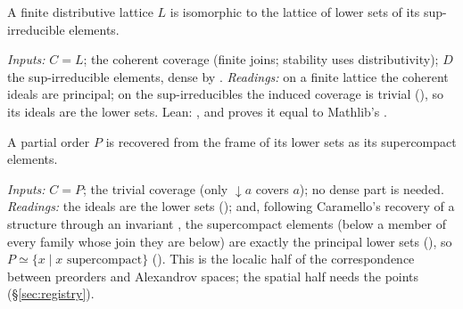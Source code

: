 \documentclass[11pt]{article}
\begin{document}
\begin{bridge}
A finite distributive lattice $L$ is isomorphic to the lattice of lower sets of its
sup-irreducible elements.
\end{bridge}
\emph{Inputs:} $C=L$; the coherent coverage (finite joins; stability uses distributivity); $D$ the
sup-irreducible elements, dense by . \emph{Readings:} on a
finite lattice the coherent ideals are principal; on the sup-irreducibles the induced coverage is
trivial (), so its ideals are the lower sets. Lean:
, and  proves it equal to Mathlib's
.

\begin{bridge}
A partial order $P$ is recovered from the frame of its lower sets as its supercompact elements.
\end{bridge}
\emph{Inputs:} $C=P$; the trivial coverage (only $\downarrow a$ covers $a$); no dense part is
needed. \emph{Readings:} the ideals are the lower sets (); and, following
Caramello's recovery of a structure through an invariant \cite[Thm.~3.27]{caramello-stone}, the
supercompact elements (below a member of every family whose join they are below) are exactly the
principal lower sets (), so $P\simeq\{x\mid x \text{ supercompact}\}$
(). This is the localic half of the correspondence between preorders
and Alexandrov spaces; the spatial half needs the points (\S\ref{sec:registry}).
\end{document}
